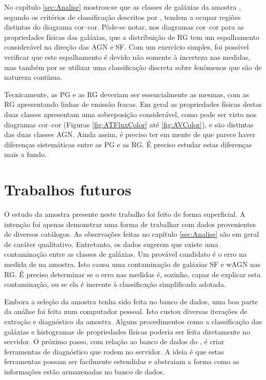 No capítulo \ref{sec:Analise} mostrou-se que as classes de galáxias da amostra
\starlightUV, segundo os critérios de classificação descritos por
\citet{CidFernandes2011}, tendem a ocupar regiões distintas do diagrama
cor--cor. Pôde-se notar, nos diagramas cor--cor para as propriedades físicas das
galáxias, que a distribuição de RG tem um espalhamento considerável na direção
das AGN e SF. Com um exercício simples, foi possível verificar que este
espalhamento é devido não somente à incerteza nas medidas, mas também por se
utilizar uma classificação discreta sobre fenômenos que são de natureza
contínua.

Tecnicamente, as PG e as RG deveriam ser essencialmente as mesmas, com as RG
apresentando linhas de emissão fracas. Em geral as propriedades físicas destas
duas classes apresentam uma sobreposição considerável, como pode ser visto nos
diagramas cor--cor (Figuras \ref{fig:ATFluxColor} até \ref{fig:AVColor}), e são
distintas das duas classes AGN. Ainda assim, é preciso ter em mente de que
parece haver diferenças sistemáticas entre as PG e as RG. É preciso estudar
estas diferenças mais a fundo.



\section{Trabalhos futuros}

O estudo da amostra \starlightUV presente neste trabalho foi feito de forma
superficial. A intenção foi apenas demonstrar uma forma de trabalhar com dados
provenientes de diversos catálogos. As observações feitas no capítulo
\ref{sec:Analise} são em geral de caráter qualitativo. Entretanto, os dados
sugerem que existe uma contaminação entre as classes de galáxias. Um provável
candidato é o erro na medida de \WHa na amostra. Isto causa uma contaminação de
galáxias SF e wAGN nas RG. É preciso determinar se o erro nas medidas é,
sozinho, capaz de explicar esta contaminação, ou se ela é inerente à
classificação simplificada adotada.

Embora a seleção da amostra tenha sido feita no banco de dados, uma boa parte da
análise foi feita num computador pessoal. Isto custou diversas iterações de
extração e diagnóstico da amostra. Alguns procedimentos como a classificação das
galáxias e histogramas de propriedades físicas poderia ser feita diretamente no
servidor. O próximo passo, com relação ao banco de dados do \starlight, é criar
ferramentas de diagnóstico que rodem no servidor. A ideia é que estas
ferramentas possam ser facilmente estendidas e abstraiam a forma como as
informações estão armazenadas no banco de dados.

